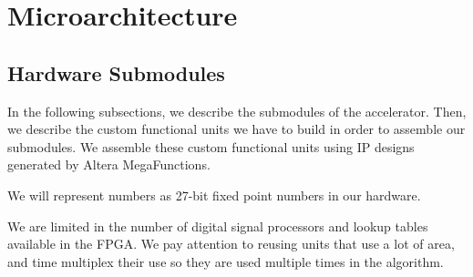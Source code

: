\section{Microarchitecture}

\subsection{Hardware Submodules}

In the following subsections, we describe the submodules of the accelerator. Then, we describe the custom functional units we have to build in order to assemble our submodules. We assemble these custom functional units using IP designs generated by Altera MegaFunctions.

We will represent numbers as 27-bit fixed point numbers in our hardware.

We are limited in the number of digital signal processors and lookup tables available in the FPGA. We pay attention to reusing units that use a lot of area, and time multiplex their use so they are used multiple times in the algorithm.






